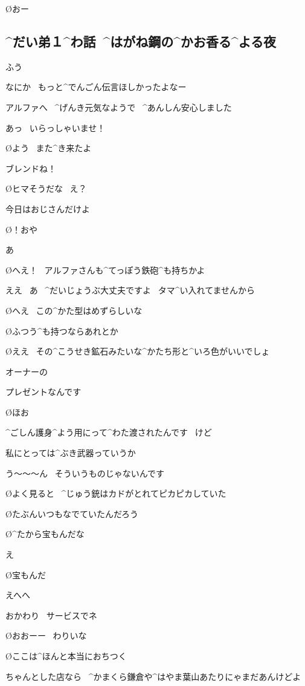 \O おー


\subsection{^{だい}{弟}１^{わ}{話}\ ^{はがね}{鋼}の^{かお}{香}る^{よる}{夜}}

\page[29]
\A ふう

\A なにか
\ もっと^{でんごん}{伝言}ほしかったよなー

\Sign アルファへ
\ ^{げんき}{元気}なようで
\ ^{あんしん}{安心}しました

\A あっ
\ いらっしゃいませ！

\O よう
\ また^{き}{来}たよ

\A ブレンドね！

\page
\O ヒマそうだな
\ え？

\A 今日はおじさんだけよ

\O ！おや

\A あ

\O へえ！
\ アルファさんも^{てっぽう}{鉄砲}^{も}{持}ちかよ

\A ええ
\ あ
\ ^{だいじょうぶ}{大丈夫}ですよ
\ タマ^{い}{入}れてませんから

\O へえ
\ この^{かた}{型}はめずらしいな

\O ふつう^{も}{持}つならあれとか

\page
\O ええ
\ その^{こうせき}{鉱石}みたいな^{かたち}{形}と^{いろ}{色}がいいでしょ

\A オーナーの

\A プレゼントなんです

\O ほお

\A ^{ごしん}{護身}^{よう}{用}にって^{わた}{渡}されたんです
\ けど

\A 私にとっては^{ぶき}{武器}っていうか

\page
\A う〜〜〜ん
\ そういうものじゃないんです

\O よく見ると
\ ^{じゅう}{銃}はカドがとれてピカピカしていた

\O たぶんいつもなでていたんだろう

\O ^{たから}{宝}もんだな

\A え

\O 宝もんだ

\A えへへ

\page
\A おかわり
\ サービスでネ

\O おおーー
\ わりいな

\page
\O ここは^{ほんと}{本当}におちつく

\A ちゃんとした店なら
\ ^{かまくら}{鎌倉}や^{はやま}{葉山}あたりにゃまだあんけどよ

